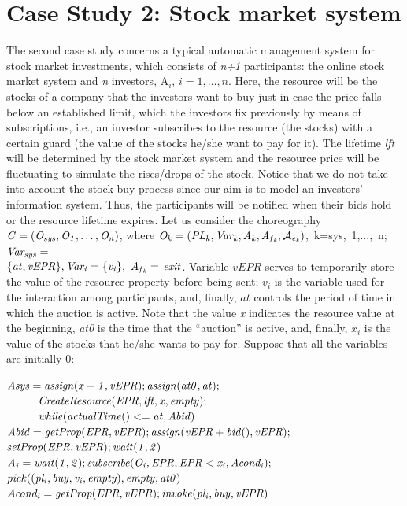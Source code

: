 \section*{Case Study 2: Stock market system}\label{cspetri2}
The second case study concerns a typical automatic management system for stock market investments, which consists of {\em n+1} participants:
the online stock market system and {\em n} investors, A$_i$, $i=1,\ldots, n$. Here, the resource will be the stocks of a company that the investors want to buy just in case the price falls below an established limit, which the investors fix previously by means of subscriptions, i.e., an investor subscribes to the resource (the stocks) with a certain guard (the value of the stocks he/she want to pay for it). The lifetime {\em lft} will be determined by the stock market system and the resource price will be fluctuating to simulate the rises/drops of the stock. Notice that we do not take into account the stock buy process since our aim is to model an investors' information system. Thus, the participants will be notified when their bids hold or the resource lifetime expires.  
Let us consider the choreography ${\it C=(O_{sys},O_1,\ldots,O_n)}$, where 
\mbox{${\it O_k=(PL_k,Var_k,A_k,A_{f{_k}},\mathcal{A}_{e{_k}})}$,~k=sys,~1,...,~n;}~\mbox{${\it Var_{sys}=}$} \\${\it \{at,vEPR\}, Var_i= \{v_i\},\ A_{f{_k}}=}$  ${\it exit}$. Variable $v{EPR}$ serves to temporarily store the value of the resource property before being sent; $v_i$ is the variable used for the interaction among participants, and, finally, $at$ controls the period of time in which the auction is active. Note that the value {\em x} indicates the resource value at the beginning, {\em at0} is the time that the ``auction'' is active, and, finally, {\em $x_i$} is the value of the stocks that he/she wants to pay for. Suppose that all the variables are initially $0$: 
\begin{flushleft}
\small{ 
${\it Asys=assign(x+1,vEPR);assign(at0,at);}$\\
$\hspace{1cm}{\it  CreateResource(EPR,lft,x,empty);}$\\	
$\hspace{1cm}{\it  while(actualTime()<=at,Abid)}$\\
${\it Abid=getProp(EPR,vEPR);assign(vEPR+bid(),vEPR);}$\\	
\hspace{1cm}${\it setProp(EPR,vEPR);wait(1,2)}$\\
${\it A_i=wait(1,2);subscribe(O_i,EPR,EPR<x_i,Acond_i);}$\\
\hspace{0.8cm}${\it pick((pl_i,buy,v_i,empty),empty,at0)}$\\
${\it Acond_i=getProp(EPR,vEPR);invoke(pl_i,buy,vEPR)}$\\
}
\end{flushleft}

